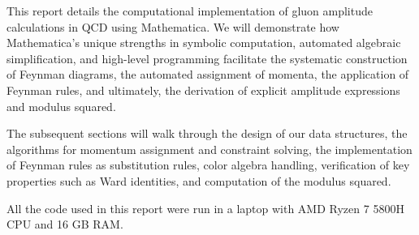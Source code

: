 \documentclass[main.tex]{subfiles}
\begin{document}

This report details the computational implementation of gluon amplitude calculations in QCD using Mathematica. 
We will demonstrate how Mathematica's unique strengths in symbolic computation, automated algebraic simplification, and high-level programming facilitate 
the systematic construction of Feynman diagrams, the automated assignment of momenta, the application of Feynman rules, and ultimately, the derivation of 
explicit amplitude expressions and modulus squared.

The subsequent sections will walk through the design of our data structures, the algorithms for momentum assignment and 
constraint solving, the implementation of Feynman rules as substitution rules, color algebra handling, verification
of key properties such as Ward identities, and computation of the modulus squared.

All the code used in this report were run in a laptop with AMD Ryzen 7 5800H CPU and 16 GB RAM.
\end{document}
